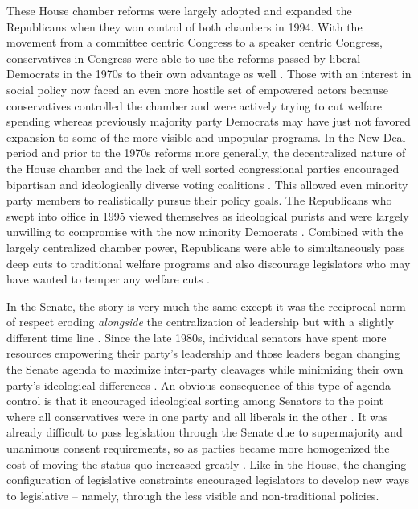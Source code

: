 \documentclass[12pt]{article}
\begin{document}
These House chamber reforms were largely adopted and expanded the Republicans when they won control of both chambers in 1994. With the movement from a committee centric Congress to a speaker centric Congress, conservatives in Congress were able to use the reforms passed by liberal Democrats in the 1970s to their own advantage as well \citep{zelizer2007}. Those with an interest in social policy now faced an even more hostile set of empowered actors because conservatives controlled the chamber and were actively trying to cut welfare spending whereas previously majority party Democrats may have just not favored expansion to some of the more visible and unpopular programs. In the New Deal period and prior to the 1970s reforms more generally, the decentralized nature of the House chamber and the lack of well sorted congressional parties encouraged bipartisan and ideologically diverse voting coalitions \citep{poole1997}. This allowed even minority party members to realistically pursue their policy goals. The Republicans who swept into office in 1995 viewed themselves as ideological purists and were largely unwilling to compromise with the now minority Democrats \citep{hacker2006, theriault2013}. Combined with the largely centralized chamber power, Republicans were able to simultaneously pass deep cuts to traditional welfare programs and also discourage legislators who may have wanted to temper any welfare cuts \citep{aldrich2000}. 

In the Senate, the story is very much the same except it was the reciprocal norm of respect eroding \emph{alongside} the centralization of leadership but with a slightly different time line \citep{sinclair1986}. Since the late 1980s, individual senators have spent more resources empowering their party's leadership and those leaders began changing the Senate agenda to maximize inter-party cleavages while minimizing their own party's ideological differences \citep{lee2008}. An obvious consequence of this type of agenda control is that it encouraged ideological sorting among Senators to the point where all conservatives were in one party and all liberals in the other \citep{poole1997}. It was already difficult to pass legislation through the Senate due to supermajority and unanimous consent requirements, so as parties became more homogenized the cost of moving the status quo increased greatly \citep{koger2010}. Like in the House, the changing configuration of legislative constraints encouraged legislators to develop new ways to legislative -- namely, through the less visible and non-traditional policies.
\end{document}
